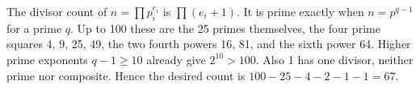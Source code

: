 The divisor count of $n=\prod p_i^{e_i}$ is $\prod(e_i+1)$. It is prime exactly when $n=p^{q-1}$ for a prime $q$. Up to 100 these are the 25 primes themselves, the four prime squares 4, 9, 25, 49, the two fourth powers 16, 81, and the sixth power 64. Higher prime exponents $q-1\ge10$ already give $2^{10}>100$. Also 1 has one divisor, neither prime nor composite. Hence the desired count is $100-25-4-2-1-1=\boxed{67}$.
